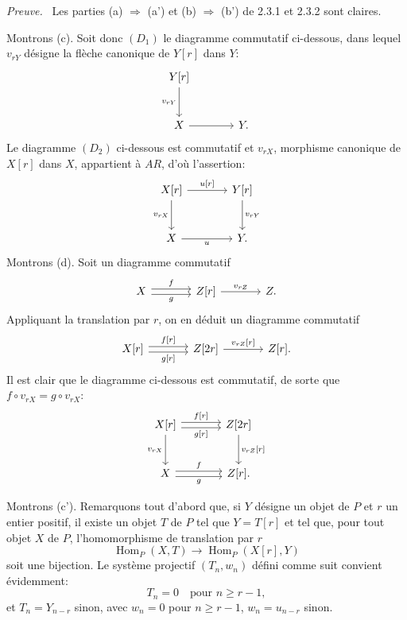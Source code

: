 \documentclass[11pt]{article}
\newenvironment{prooftext}[1][Proof]{\par\noindent\emph{#1.}\ }{\par\medskip}
\DeclareMathOperator{\Hom}{Hom}
\providecommand{\Hom}{\operatorname{Hom}}
\providecommand{\Hom}{\operatorname{Hom}}
\begin{document}
\begin{prooftext}[Preuve]
Les parties (a) $\Rightarrow$ (a') et (b) $\Rightarrow$ (b') de 2.3.1 et 2.3.2 sont claires.

Montrons (c). Soit donc $(D_1)$ le diagramme commutatif ci-dessous, dans lequel $v_{rY}$ désigne la flèche canonique de $Y[r]$ dans $Y$:
\[
\begin{tikzcd}[column sep=large,row sep=large]
Y[r] \arrow[d,"{v_{rY}}"']\\
X \arrow[r] & Y .
\end{tikzcd}
\]
Le diagramme $(D_2)$ ci-dessous est commutatif et $v_{rX}$, morphisme canonique de $X[r]$ dans $X$, appartient à $AR$, d'où l'assertion:
\[
\begin{tikzcd}[column sep=large,row sep=large]
X[r] \arrow[r,"{u[r]}"] \arrow[d,"{v_{rX}}"'] & Y[r] \arrow[d,"{v_{rY}}"]\\
X \arrow[r,"u"'] & Y .
\end{tikzcd}
\]
Montrons (d). Soit un diagramme commutatif
\[
\begin{tikzcd}[column sep=large]
X \arrow[r,shift left,"f"] \arrow[r,shift right,"g"'] & Z[r] \arrow[r,"{v_{rZ}}"] & Z .
\end{tikzcd}
\]
Appliquant la translation par $r$, on en déduit un diagramme commutatif
\[
\begin{tikzcd}[column sep=large]
X[r] \arrow[r,shift left,"{f[r]}"] \arrow[r,shift right,"{g[r]}"'] & Z[2r] \arrow[r,"{v_{rZ}[r]}"] & Z[r].
\end{tikzcd}
\]
Il est clair que le diagramme ci-dessous est commutatif, de sorte que $f\circ v_{rX}=g\circ v_{rX}$:
\[
\begin{tikzcd}[column sep=large,row sep=large]
X[r] \arrow[r,shift left,"{f[r]}"] \arrow[r,shift right,"{g[r]}"'] \arrow[d,"{v_{rX}}"'] & Z[2r] \arrow[d,"{v_{rZ}[r]}"]\\
X \arrow[r,shift left,"f"] \arrow[r,shift right,"g"'] & Z[r] .
\end{tikzcd}
\]

Montrons (c'). Remarquons tout d'abord que, si $Y$ désigne un objet de $P$ et $r$ un entier positif, il existe un objet $T$ de $P$ tel que $Y=T[r]$ et tel que, pour tout objet $X$ de $P$, l'homomorphisme de translation par $r$
\[
\Hom_P(X,T)\longrightarrow\Hom_P(X[r],Y)
\]
soit une bijection. Le système projectif $(T_n,w_n)$ défini comme suit convient évidemment:
\[
T_n=0\quad\text{pour } n\ge r-1,
\]
et $T_n=Y_{n-r}$ sinon, avec $w_n=0$ pour $n\ge r-1$, $w_n=u_{n-r}$ sinon.


\end{prooftext}
\end{document}
